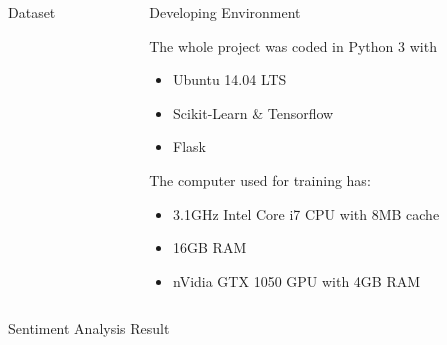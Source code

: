 \documentclass[final]{beamer}
\newlength{\onecolwid}
\newlength{\twocolwid}
\begin{document}
\begin{frame}[t]
\begin{columns}[t]
\begin{column}{\twocolwid}
\begin{columns}[t,totalwidth=\twocolwid]
\begin{column}{\onecolwid}
\begin{block}{Dataset}
\end{block}


\end{column} %

\begin{column}{\onecolwid}\vspace{-.6in} %


\begin{block}{Developing Environment}

The whole project was coded in Python 3 with
\begin{itemize}
    \item Ubuntu 14.04 LTS
    \item Scikit-Learn \& Tensorflow
    \item Flask
\end{itemize}

The computer used for training has:
\begin{itemize}
    \item 3.1GHz Intel Core i7 CPU with 8MB cache
    \item 16GB RAM
    \item nVidia GTX 1050 GPU with 4GB RAM
\end{itemize}


\end{block}


\end{column} %

\end{columns} %


\begin{alertblock}{Sentiment Analysis Result}


\end{alertblock}
\end{column}
\end{columns}
\end{frame}
\end{document}
